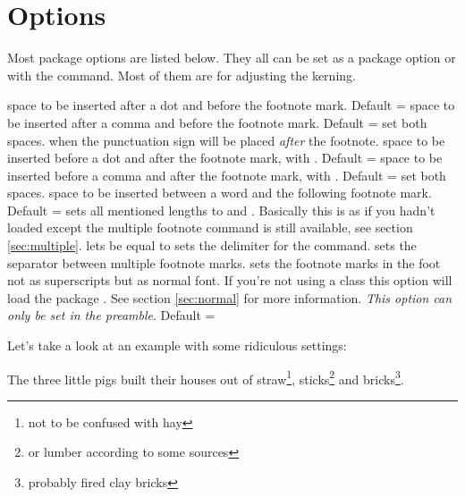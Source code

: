 \documentclass[toc=index,toc=bib]{cnpkgdoc}
\begin{document}
\section{Options}\label{sec:options}
Most package options are listed below. They all can be set as a package option or
with the  command. Most of them are for adjusting the kerning.
\begin{beschreibung}
  space to be inserted after a dot and before the
 footnote mark. Default = \code{-.06em}
  space to be inserted after a comma and before
 the footnote mark. Default = \code{-.06em}
  set both spaces.
  when  the punctuation sign
 will be placed \emph{after} the footnote.
  space to be inserted before a dot and after the
 footnote mark, \ie with . Default = \code{-.15em}
  space to be inserted before a comma and after
 the footnote mark, \ie with . Default = \code{-.15em}
  set both spaces.
  space to be inserted between a word and the
 following footnote mark. Default = \code{.06em}
  sets all mentioned lengths to  and .
 Basically this is as if you hadn't loaded \fnpct except the multiple footnote
 command is still available, see section \ref{sec:multiple}.
  lets  be equal to
  sets the delimiter for the 
 command.
  sets the separator between multiple footnote
 marks.
  sets the footnote marks in the foot
 not as superscripts but as normal font. If you're not using a 
 class this option will load the package . See section \ref{sec:normal}
 for more information. \emph{This option can only be set in the preamble}. Default
 = 
\end{beschreibung}

Let's take a look at an example with some ridiculous settings:
\begin{beispiel}
 \begin{minipage}{.4\linewidth}
  \noindent The three little pigs built their houses
  out of straw\footnote{not to be confused with hay},
  sticks\footnote{or lumber according to some sources}
  and bricks\footnote{probably fired clay bricks}.
 \end{minipage}
\end{beispiel}
\end{document}
